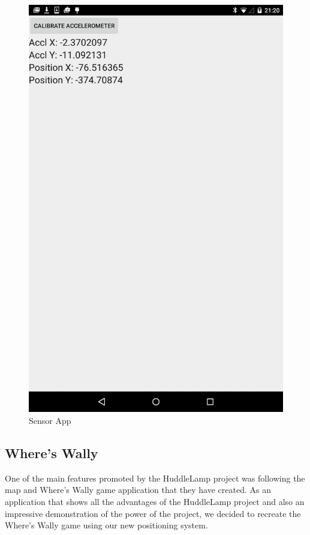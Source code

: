 \begin{figure}[h]
\centering
    \includegraphics[scale=0.2]{images/sensor}
    \protect\caption{Sensor App} 
    \label{sensor_app_image}
\end{figure}


\subsection{Where's Wally}
One of the main features promoted by the HuddleLamp project was following the map and Where's Wally game application that they have created. As an application that shows all the advantages of the HuddleLamp project and also an impressive demonstration of the power of the project, we decided to recreate the Where's Wally game using our new positioning system. 

